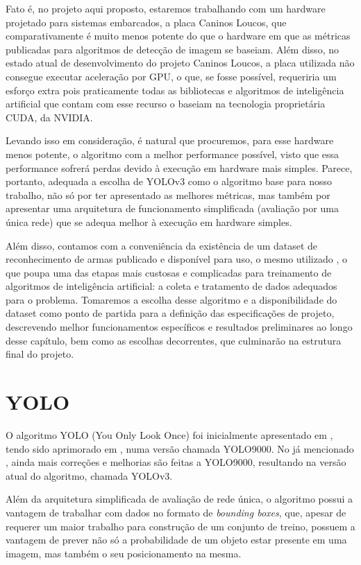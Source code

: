 \documentclass[]{politex}
\begin{document}
Fato é, no projeto aqui proposto, estaremos trabalhando com um hardware projetado para sistemas embarcados, a placa Caninos Loucos, que comparativamente é muito menos potente do que o hardware em que as métricas publicadas para algoritmos de detecção de imagem se baseiam. Além disso, no estado atual de desenvolvimento do projeto Caninos Loucos, a placa utilizada não consegue executar aceleração por GPU, o que, se fosse possível, requeriria um esforço extra pois praticamente todas as bibliotecas e algoritmos de inteligência artificial que contam com esse recurso o baseiam na tecnologia proprietária CUDA, da NVIDIA.

Levando isso em consideração, é natural que procuremos, para esse hardware menos potente, o algoritmo com a melhor performance possível, visto que essa performance sofrerá perdas devido à execução em hardware mais simples. Parece, portanto, adequada a escolha de YOLOv3 como o algoritmo base para nosso trabalho, não só por ter apresentado as melhores métricas, mas também por apresentar uma arquitetura de funcionamento simplificada (avaliação por uma única rede) que se adequa melhor à execução em hardware simples.

Além disso, contamos com a conveniência da existência de um dataset de reconhecimento de armas publicado e disponível para uso, o mesmo utilizado \citeyear{olmos1} \citeauthor{olmos1}, o que poupa uma das etapas mais custosas e complicadas para treinamento de algoritmos de inteligência artificial: a coleta e tratamento de dados adequados para o problema. Tomaremos a escolha desse algoritmo e a disponibilidade do dataset como ponto de partida para a definição das especificações de projeto, descrevendo melhor funcionamentos específicos e resultados preliminares ao longo desse capítulo, bem como as escolhas decorrentes, que culminarão na estrutura final do projeto.

\section{YOLO}

O algoritmo YOLO (You Only Look Once) foi inicialmente apresentado em \citeyear{yolov1} \citeauthor{yolov1}, tendo sido aprimorado em \citeyear{yolo9000} \citeauthor{yolo9000}, numa versão chamada YOLO9000. No já mencionado \citeyear{yolov3} \citeauthor{yolov3}, ainda mais correções e melhorias são feitas a YOLO9000, resultando na versão atual do algoritmo, chamada YOLOv3.

Além da arquitetura simplificada de avaliação de rede única, o algoritmo possui a vantagem de trabalhar com dados no formato de \textit{bounding boxes}, que, apesar de requerer um maior trabalho para construção de um conjunto de treino, possuem a vantagem de prever não só a probabilidade de um objeto estar presente em uma imagem, mas também o seu posicionamento na mesma.
\end{document}

